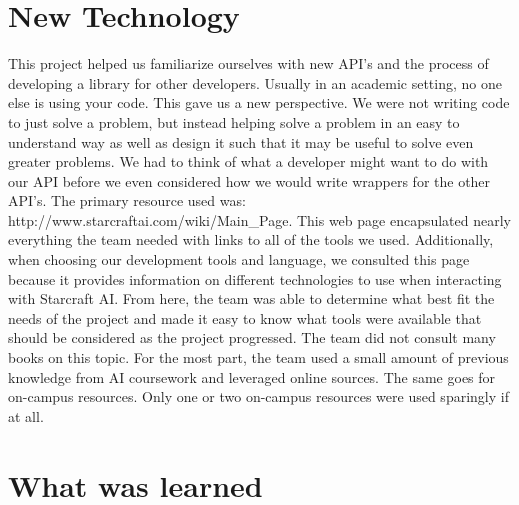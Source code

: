 \documentclass[10pt,letterpaper,onecolumn,draftclsnofoot]{IEEEtran}
\begin{document}
\section{New Technology}
	This project helped us familiarize ourselves with new API's and the process of developing a library for other developers. Usually in an academic setting, no one else is using your code. This gave us a new perspective. We were not writing code to just solve a problem, but instead helping solve a problem in an easy to understand way as well as design it such that it may be useful to solve even greater problems. We had to think of what a developer might want to do with our API before we even considered how we would write wrappers for the other API's. 
	The primary resource used was: http://www.starcraftai.com/wiki/Main\_Page. This web page encapsulated nearly everything the team needed with links to all of the tools we used. Additionally, when choosing our development tools and language, we consulted this page because it provides information on different technologies to use when interacting with Starcraft AI. From here, the team was able to determine what best fit the needs of the project and made it easy to know what tools were available that should be considered as the project progressed.
	The team did not consult many books on this topic. For the most part, the team used a small amount of previous knowledge from AI coursework and leveraged online sources. The same goes for on-campus resources. Only one or two on-campus resources were used sparingly if at all. 

\section{What was learned}
\end{document}
